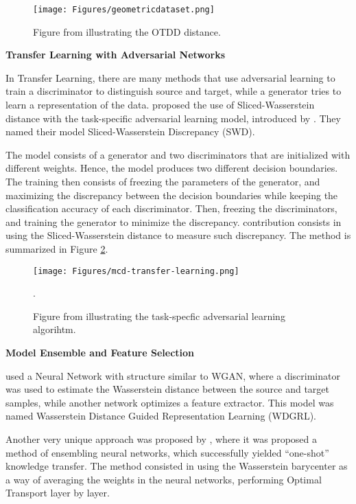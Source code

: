 \begin{figure}[H]
	\centering
	\texttt{[image: Figures/geometricdataset.png]}
	\caption{Figure from \citet{alvarez2020geometric} illustrating the OTDD distance.}
	\label{fig:geometricdataset}
\end{figure}

\vspace{5mm}
\noindent \textbf{Transfer Learning with Adversarial Networks}
\vspace{3mm}

In Transfer Learning, there are many methods that use adversarial learning to train a discriminator
to distinguish source and target, while a generator tries to learn a representation of the data.
\citet{lee2019sliced} proposed the use of Sliced-Wasserstein distance with the task-specific adversarial
learning model, introduced by \citet{saito2018maximum}. They named their model Sliced-Wasserstein Discrepancy (SWD).

The model consists of a generator and two discriminators that are initialized with different weights.
Hence, the model produces two different decision boundaries. The training then consists of freezing the parameters
of the generator, and
maximizing the
discrepancy between the decision boundaries while keeping the classification accuracy of each discriminator. Then,
freezing the discriminators, and training the generator to minimize the discrepancy.
\citet{lee2019sliced} contribution consists in using the Sliced-Wasserstein distance to measure such discrepancy.
The method is summarized in Figure \ref{fig:swd-tl}.


\begin{figure}[H]
	\centering
	\texttt{[image: Figures/mcd-transfer-learning.png]}
	\caption{Figure from \citet{saito2018maximum} illustrating the task-specfic adversarial learning algorihtm.}.
	\label{fig:swd-tl}
\end{figure}

\vspace{5mm}
\noindent \textbf{Model Ensemble and Feature Selection}
\vspace{3mm}

\citet{shen2018wasserstein} used a Neural Network with structure similar to WGAN, where a discriminator
was used to estimate the Wasserstein distance between the source and target samples, while
another network optimizes a feature extractor. This model was named
Wasserstein Distance Guided Representation Learning (WDGRL).


Another very unique approach was proposed by \citet{sidakfusion20}, where it was proposed
a method of ensembling neural networks, which successfully yielded ``one-shot'' knowledge transfer.
The method consisted in using the Wasserstein barycenter as a way of averaging the
weights in the neural networks, performing Optimal Transport layer by layer.

